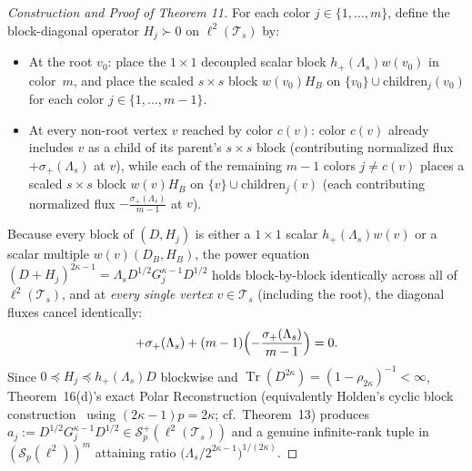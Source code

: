 \documentclass[10pt,letterpaper]{article}
\newcommand{\Sp}{\mathcal{S}_p}
\newcommand{\Tr}{\operatorname{Tr}}
\begin{document}
\begin{proof}[Construction and Proof of Theorem 11]
For each color $j \in \{1,\dots,m\}$, define the block-diagonal operator $H_j \succ 0$ on $\ell^2(\mathcal{T}_s)$ by:
\begin{itemize}[leftmargin=1.5em,itemsep=1.5pt]
  \item At the root $v_0$: place the $1\times 1$ decoupled scalar block $h_+(\Lambda_s) w(v_0)$ in color~$m$, and place the scaled $s\times s$ block $w(v_0) H_B$ on $\{v_0\} \cup \text{children}_j(v_0)$ for each color $j \in \{1,\dots,m-1\}$.
  \item At every non-root vertex $v$ reached by color $c(v)$: color $c(v)$ already includes $v$ as a child of its parent's $s\times s$ block (contributing normalized flux $+\sigma_+(\Lambda_s)$ at $v$), while each of the remaining $m - 1$ colors $j \neq c(v)$ places a scaled $s\times s$ block $w(v) H_B$ on $\{v\} \cup \text{children}_j(v)$ (each contributing normalized flux $-\frac{\sigma_+(\Lambda_s)}{m-1}$ at $v$).
\end{itemize}
Because every block of $(D, H_j)$ is either a $1\times 1$ scalar $h_+(\Lambda_s) w(v)$ or a scalar multiple $w(v)(D_B, H_B)$, the power equation $(D + H_j)^{2\kappa-1} = \Lambda_s D^{1/2} G_j^{\kappa-1} D^{1/2}$ holds block-by-block identically across all of $\ell^2(\mathcal{T}_s)$, and at \emph{every single vertex} $v \in \mathcal{T}_s$ (including the root), the diagonal fluxes cancel identically:
\[
  +\sigma_+(\Lambda_s) + (m - 1)\Bigl(-\frac{\sigma_+(\Lambda_s)}{m - 1}\Bigr) = 0.
\]
Since $0 \preceq H_j \preceq h_+(\Lambda_s) D$ blockwise and $\Tr(D^{2\kappa}) = (1 - \rho_{2\kappa})^{-1} < \infty$, Theorem~16(d)'s exact Polar Reconstruction (equivalently Holden's cyclic block construction~\cite[Prop.~2.2]{Holden2026b} using $(2\kappa-1)p = 2\kappa$; cf.\ Theorem~13) produces $a_j := D^{1/2} G_j^{\kappa-1} D^{1/2} \in \mathcal{S}_p^+(\ell^2(\mathcal{T}_s))$ and a genuine infinite-rank tuple in $(\Sp(\ell^2))^m$ attaining ratio $\bigl(\Lambda_s / 2^{2\kappa-1}\bigr)^{1/(2\kappa)}$.


\end{proof}
\end{document}
